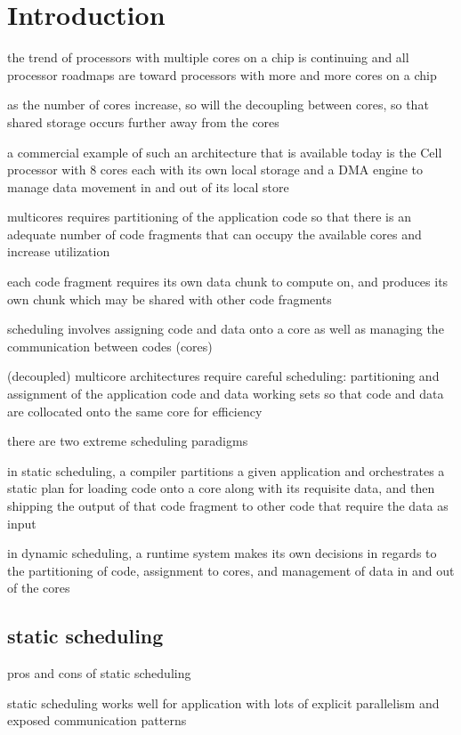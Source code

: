 \section{Introduction}

the trend of processors with multiple cores on a chip is continuing
and all processor roadmaps are toward processors with more and more
cores on a chip

as the number of cores increase, so will the decoupling between cores,
so that shared storage occurs further away from the cores

a commercial example of such an architecture that is available today
is the Cell processor with 8 cores each with its own local storage and
a DMA engine to manage data movement in and out of its local store

multicores requires partitioning of the application code so that there
is an adequate number of code fragments that can occupy the available
cores and increase utilization

each code fragment requires its own data chunk to compute on, and
produces its own chunk which may be shared with other code fragments

scheduling involves assigning code and data onto a core as well as
managing the communication between codes (cores)

(decoupled) multicore architectures require careful scheduling:
partitioning and assignment of the application code and data working
sets so that code and data are collocated onto the same core for
efficiency

there are two extreme scheduling paradigms

in static scheduling, a compiler partitions a given application and
orchestrates a static plan for loading code onto a core along with its
requisite data, and then shipping the output of that code fragment to
other code that require the data as input

in dynamic scheduling, a runtime system makes its own decisions in
regards to the partitioning of code, assignment to cores, and
management of data in and out of the cores
~\cite{streamitweb}

\subsection{static scheduling}

pros and cons of static scheduling

static scheduling works well for application with lots of explicit
parallelism and exposed communication patterns

